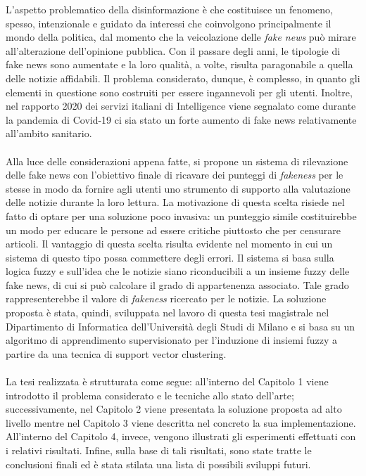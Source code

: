 \documentclass[12pt]{report}
\theoremstyle{definition}
\begin{document}
L'aspetto problematico della disinformazione è che costituisce un fenomeno, spesso, intenzionale e guidato da interessi che coinvolgono principalmente il mondo della politica, dal momento che la veicolazione delle \textit{fake news} può mirare all'alterazione dell'opinione pubblica. 
Con il passare degli anni, le tipologie di fake news sono aumentate e la loro qualità, a volte, risulta paragonabile a quella delle notizie affidabili. Il problema considerato, dunque, è complesso, in quanto gli elementi in questione sono costruiti per essere ingannevoli per gli utenti.
Inoltre, nel rapporto 2020 dei servizi italiani di Intelligence viene segnalato come durante la pandemia di Covid-19 ci sia stato un forte aumento di fake news relativamente all'ambito sanitario.
\\
\\
Alla luce delle considerazioni appena fatte, si propone un sistema di rilevazione delle fake news con l'obiettivo finale di ricavare dei punteggi di \textit{fakeness} per le stesse in modo da fornire agli utenti uno strumento di supporto alla valutazione delle notizie durante la loro lettura.
La motivazione di questa scelta risiede nel fatto di optare per una soluzione poco invasiva: un punteggio simile costituirebbe un modo per educare le persone ad essere critiche piuttosto che per censurare articoli. Il vantaggio di questa scelta risulta evidente nel momento in cui un sistema di questo tipo possa commettere degli errori.
Il sistema si basa sulla logica fuzzy e sull'idea che le notizie siano riconducibili a un insieme fuzzy delle fake news, di cui si può calcolare il grado di appartenenza associato. Tale grado rappresenterebbe il valore di \textit{fakeness} ricercato per le notizie.
La soluzione proposta è stata, quindi, sviluppata nel lavoro di questa tesi magistrale nel Dipartimento di Informatica dell'Università degli Studi di Milano e si basa su un algoritmo di apprendimento supervisionato per l'induzione di insiemi fuzzy a partire da una tecnica di support vector clustering.
\\
\\
La tesi realizzata è strutturata come segue:
all'interno del Capitolo 1 viene introdotto il problema considerato e le tecniche allo stato dell'arte; successivamente, nel Capitolo 2 viene presentata la soluzione proposta ad alto livello mentre nel Capitolo 3 viene descritta nel concreto la sua implementazione. All'interno del Capitolo 4, invece, vengono illustrati gli esperimenti effettuati con i relativi risultati. Infine, sulla base di tali risultati, sono state tratte le conclusioni finali ed è stata stilata una lista di possibili sviluppi futuri.
\end{document}
